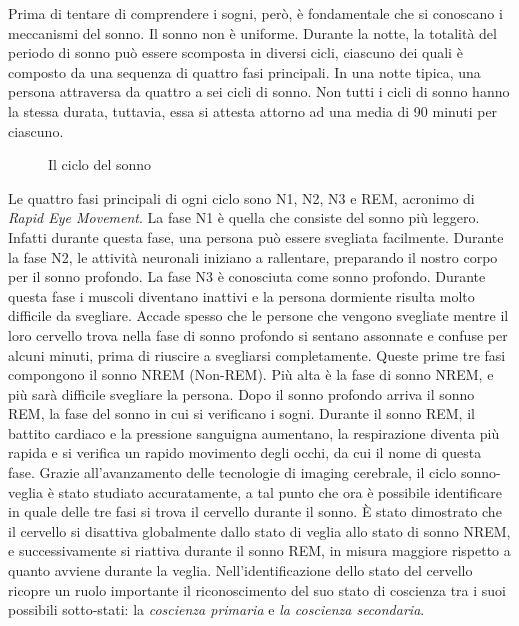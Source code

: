 Prima di tentare di comprendere i sogni, però, è fondamentale che si conoscano i meccanismi del sonno.
Il sonno non è uniforme.
Durante la notte, la totalità del periodo di sonno può essere scomposta in diversi cicli, ciascuno dei quali è
composto da una sequenza di quattro fasi principali.
In una notte tipica, una persona attraversa da quattro a sei cicli di sonno.
Non tutti i cicli di sonno hanno la stessa durata, tuttavia, essa si attesta attorno ad una media di 90 minuti per
ciascuno.

\begin{figure}[t]
    \centering
    
    \vspace{-10pt}
    \caption{Il ciclo del sonno}
    \label{fig:sleep-cycle}
\end{figure}

Le quattro fasi principali di ogni ciclo sono N1, N2, N3 e REM, acronimo di \textit{Rapid Eye Movement}.
La fase N1 è quella che consiste del sonno più leggero.
Infatti durante questa fase, una persona può essere svegliata facilmente.
Durante la fase N2, le attività neuronali iniziano a rallentare, preparando il nostro corpo per il sonno
profondo.
La fase N3 è conosciuta come sonno profondo.
Durante questa fase i muscoli diventano inattivi e la persona dormiente risulta molto difficile da svegliare.
Accade spesso che le persone che vengono svegliate mentre il loro cervello trova nella fase di sonno profondo
si sentano assonnate e confuse per alcuni minuti, prima di riuscire a svegliarsi completamente.
Queste prime tre fasi compongono il sonno NREM (Non-REM).
Più alta è la fase di sonno NREM, e più sarà difficile svegliare la persona.
Dopo il sonno profondo arriva il sonno REM, la fase del sonno in cui si verificano i sogni.
Durante il sonno REM, il battito cardiaco e la pressione sanguigna aumentano, la respirazione diventa più rapida e
si verifica un rapido movimento degli occhi, da cui il nome di questa fase.
Grazie all'avanzamento delle tecnologie di imaging cerebrale, il ciclo sonno-veglia è stato studiato accuratamente,
a tal punto che ora è possibile identificare in quale delle tre fasi si trova il cervello durante il sonno.
\`E stato dimostrato che il cervello si disattiva globalmente dallo stato di veglia allo stato di sonno NREM,
e successivamente si riattiva durante il sonno REM, in misura maggiore rispetto a quanto avviene durante la veglia.
Nell'identificazione dello stato del cervello ricopre un ruolo importante il riconoscimento del suo stato di coscienza
tra i suoi possibili sotto-stati: la \textit{coscienza primaria} e \textit{la coscienza secondaria}.
